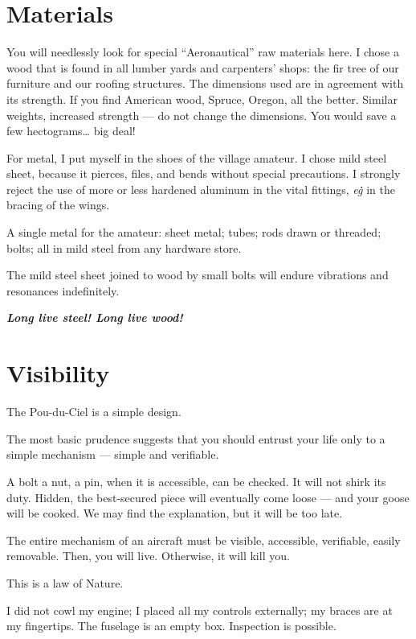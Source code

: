 \documentclass{book}
\begin{document}
\section{Materials}

You will needlessly look for special ``Aeronautical'' raw materials
here. I chose a wood that is found in all lumber yards and carpenters'
shops: the fir tree of our furniture and our roofing structures. The
dimensions used are in agreement with its strength. If you find
American wood, Spruce, Oregon, all the better. Similar weights,
increased strength --- do not change the dimensions. You would save a
few hectograms\ldots{} big deal!

For metal, I put myself in the shoes of the village amateur. I chose
mild steel sheet, because it pierces, files, and bends without special
precautions. I strongly reject the use of more or less hardened
aluminum in the vital fittings, \textit{e\.g\.} in the bracing of the
wings.

A single metal for the amateur: sheet metal; tubes; rods drawn or
threaded; bolts; all in mild steel from any hardware store.

The mild steel sheet joined to wood by small bolts will endure
vibrations and resonances indefinitely.

\textbf{\emph{Long live steel! Long live wood!}}

\section{Visibility}

The Pou-du-Ciel is a simple design.

The most basic prudence suggests that you should entrust your life
only to a simple mechanism --- simple and verifiable.

A bolt a nut, a pin, when it is accessible, can be checked. It will
not shirk its duty. Hidden, the best-secured piece will eventually
come loose --- and your goose will be cooked.  We may find the
explanation, but it will be too late.

The entire mechanism of an aircraft must be visible, accessible,
verifiable, easily removable. Then, you will live. Otherwise, it will
kill you.

This is a law of Nature.

I did not cowl my engine; I placed all my controls externally; my
braces are at my fingertips. The fuselage is an empty box. Inspection
is possible.
\end{document}
